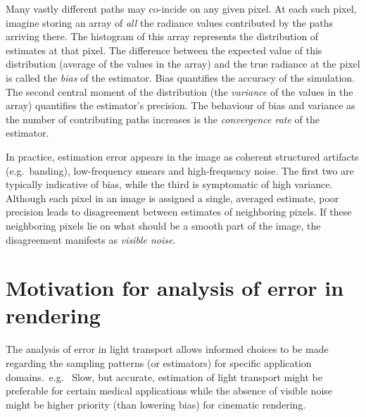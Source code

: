 \documentclass{acmsiggraph}
\begin{document}

Many vastly different paths may co-incide on any given pixel. At each such pixel, imagine storing an array of \textit{all} the radiance values contributed by the paths arriving there. The histogram of this array represents the distribution of estimates at that pixel. The difference between the expected value of this distribution (average of the values in the array) and the true radiance at the pixel is called the \textit{bias} of the estimator. Bias quantifies the accuracy of the simulation.  The second central moment of the distribution (the \textit{variance} of the values in the array) quantifies the estimator's precision. The behaviour of bias and variance as the number of contributing paths increases is the \textit{convergence rate} of the estimator. 

In practice, estimation error appears in the image as coherent structured artifacts (e.g.~banding), low-frequency smears and high-frequency noise. The first two are typically indicative of bias, while the third is symptomatic of high variance. Although each pixel in an image is assigned a single, averaged estimate, poor precision leads to disagreement between estimates of neighboring pixels. If these neighboring pixels lie on what should be a smooth part of the image, the disagreement manifests as \textit{visible noise}.

\section{Motivation for analysis of error in rendering}
The analysis of error in light transport allows informed choices to be made regarding the sampling patterns (or estimators) for specific application domains.~e.g.~ Slow, but accurate, estimation of light transport might be preferable for certain medical applications while the absence of visible noise might be higher priority (than lowering bias) for cinematic rendering.
\end{document}
